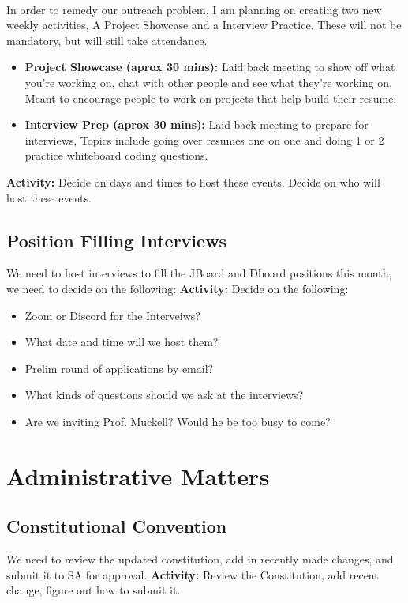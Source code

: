 \documentclass{article}
\begin{document}
\paragraph{}
In order to remedy our outreach problem, I am planning on creating two new weekly activities, A Project Showcase and a Interview Practice. These will not be mandatory, but will still take attendance. 
\begin{itemize}
    \item \textbf{Project Showcase (aprox 30 mins):} Laid back meeting to show off what you're working on, chat with other people and see what they're working on. Meant to encourage people to work on projects that help build their resume. 
    \item \textbf{Interview Prep (aprox 30 mins):}  Laid back meeting to prepare for interviews, Topics include going over resumes one on one and doing 1 or 2 practice whiteboard coding questions. 
\end{itemize}
\textbf{Activity:} Decide on days and times to host these events. Decide on who will host these events. 
\newpage
\subsection{Position Filling Interviews}
We need to host interviews to fill the JBoard and Dboard positions this month, we need to decide on the following:
\newline\newline
\textbf{Activity:} Decide on the following:
\begin{itemize}
    \item Zoom or Discord for the Interveiws? 
    \item What date and time will we host them?
    \item Prelim round of applications by email?
    \item What kinds of questions should we ask at the interviews?
    \item Are we inviting Prof. Muckell? Would he be too busy to come?  
\end{itemize}

 





\section{Administrative Matters}
\subsection{Constitutional Convention}
We need to review the updated constitution, add in recently made changes, and submit it to SA for approval. 
\newline\newline
\textbf{Activity:} Review the Constitution, add recent change, figure out how to submit it. 
\end{document}
